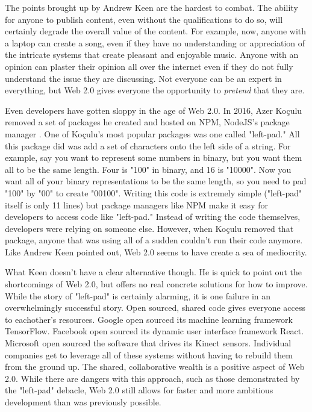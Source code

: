 \documentclass[12pt]{article}
\begin{document}
The points brought up by Andrew Keen are the hardest to combat.  The ability for anyone to publish content, even without the qualifications to do so, will certainly degrade the overall value of the content.  For example, now, anyone with a laptop can create a song, even if they have no understanding or appreciation of the intricate systems that create pleasant and enjoyable music.  Anyone with an opinion can plaster their opinion all over the internet even if they do not fully understand the issue they are discussing.  Not everyone can be an expert in everything, but Web 2.0 gives everyone the opportunity to \textit{pretend} that they are.

Even developers have gotten sloppy in the age of Web 2.0.  In 2016, Azer Koçulu removed a set of packages he created and hosted on NPM, NodeJS's package manager \cite{left-pad}.  One of Koçulu's most popular packages was one called "left-pad."  All this package did was add a set of characters onto the left side of a string.  For example, say you want to represent some numbers in binary, but you want them all to be the same length.  Four is "100" in binary, and 16 is "10000".  Now you want all of your binary representations to be the same length, so you need to pad "100" by "00" to create "00100".  Writing this code is extremely simple ("left-pad" itself is only 11 lines) but package managers like NPM make it easy for developers to access code like "left-pad."  Instead of writing the code themselves, developers were relying on someone else.  However, when Koçulu removed that package, anyone that was using all of a sudden couldn't run their code anymore.  Like Andrew Keen pointed out, Web 2.0 seems to have create a sea of mediocrity.

What Keen doesn't have a clear alternative though.  He is quick to point out the shortcomings of Web 2.0, but offers no real concrete solutions for how to improve.  While the story of "left-pad" is certainly alarming, it is one failure in an overwhelmingly successful story.  Open sourced, shared code gives everyone access to eachother's resources.  Google open sourced its machine learning framework TensorFlow.  Facebook open sourced its dynamic user interface framework React.  Microsoft open sourced the software that drives its Kinect sensors.  Individual companies get to leverage all of these systems without having to rebuild them from the ground up.  The shared, collaborative wealth is a positive aspect of Web 2.0.  While there are dangers with this approach, such as those demonstrated by the "left-pad" debacle, Web 2.0 still allows for faster and more ambitious development than was previously possible.
\end{document}
